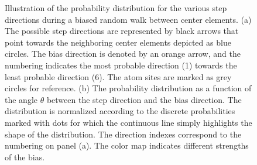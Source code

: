 \begin{figure}[h]
     \caption{Illustration of the probability distribution for the various step directions during a biased random walk between center elements. (a) The possible step directions are represented by black arrows that point towards the neighboring center elements depicted as blue circles. The bias direction is denoted by an orange arrow, and the numbering indicates the most probable direction (1) towards the least probable direction (6). The atom sites are marked as grey circles for reference. (b) The probability distribution as a function of the angle $\theta$ between the step direction and the bias direction. The distribution is normalized according to the discrete probabilities marked with dots for which the continuous line simply highlights the shape of the distribution. The direction indexes correspond to the numbering on panel (a). The color map indicates different strengths of the bias. }
     \label{fig:bias_prob}
\end{figure}


